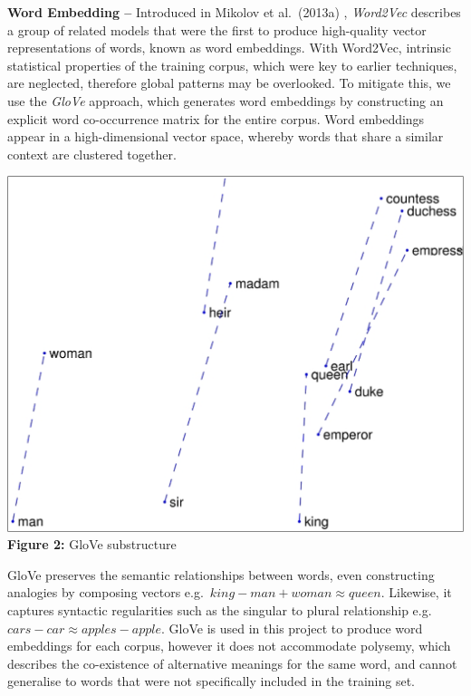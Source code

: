 \documentclass[12pt,a4paper]{article}
\begin{document}
\noindent \textbf{Word Embedding --} Introduced in Mikolov et al.\ (2013a) \cite{mikolov2013efficient}, \textit{Word2Vec} describes a group of related models that were the first to produce high-quality vector representations of words, known as word embeddings. With Word2Vec, intrinsic statistical properties of the training corpus, which were key to earlier techniques, are neglected, therefore global patterns may be overlooked. To mitigate this, we use the \textit{GloVe} \cite{pennington2014glove} approach, which generates word embeddings by constructing an explicit word co-occurrence matrix for the entire corpus. Word embeddings appear in a high-dimensional vector space, whereby words that share a similar context are clustered together.\\\vspace{-5pt}

\begin{minipage}{0.38\textwidth}
	\vspace{-10pt}
	\begin{center}
		\hspace{-1cm}\includegraphics[width=1.05\textwidth]{Images/outside1.png}\\
		\hspace{-1cm}\textbf{Figure 2:} GloVe substructure\footnotemark[6]\\
		\label{Glove Model}
	\end{center}
\end{minipage} \hfill
\begin{minipage}{0.58\textwidth}
	 GloVe preserves the semantic relationships between words, even constructing analogies by composing vectors e.g.\ $king - man + woman ≈ queen$. Likewise, it captures syntactic regularities such as the singular to plural relationship e.g.\ $cars - car ≈ apples - apple$. GloVe is used in this project to produce word embeddings for each corpus, however it does not accommodate polysemy, which describes the co-existence of alternative meanings for the same word, and cannot generalise to words that were not specifically included in the training set.\\
\end{minipage}\\
\end{document}
